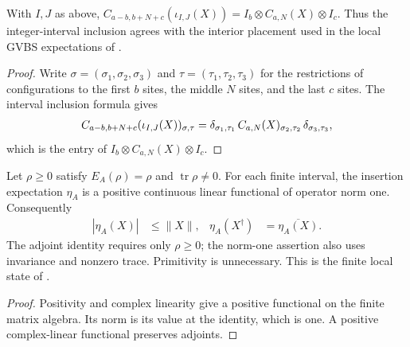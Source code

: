 \begin{lemma}
    \label{thm:local_interval_bulk_observable}
    \leanok
    With $I,J$ as above,
    $C_{a-b,b+N+c}(\iota_{I,J}(X))=I_b\otimes C_{a,N}(X)\otimes I_c$.
    Thus the integer-interval inclusion agrees with the interior placement
    used in the local GVBS expectations of
    \cite[Section~3, equations (3.1)--(3.2b)]{Nachtergaele1996Spectral}.
\end{lemma}
\begin{proof}\leanok
    Write $\sigma=(\sigma_1,\sigma_2,\sigma_3)$ and $\tau=(\tau_1,\tau_2,\tau_3)$
    for the restrictions of configurations to the first $b$ sites, the middle
    $N$ sites, and the last $c$ sites. The interval inclusion formula gives
    \begin{align}
        C_{a-b,b+N+c}(\iota_{I,J}(X))_{\sigma,\tau}
        =\delta_{\sigma_1,\tau_1}\,C_{a,N}(X)_{\sigma_2,\tau_2}\,
        \delta_{\sigma_3,\tau_3},
        \notag
    \end{align}
    which is the entry of $I_b\otimes C_{a,N}(X)\otimes I_c$.
\end{proof}

\begin{lemma}
    \label{thm:primitive_insertion_state_norm}
    \leanok
    Let $\rho\geq0$ satisfy $E_A(\rho)=\rho$ and
    $\operatorname{tr}\rho\neq0$. For each finite interval, the insertion
    expectation $\eta_A$ is a positive continuous linear functional of
    operator norm one. Consequently
    \begin{align}
        |\eta_A(X)| & \leq\|X\|,
                    & \eta_A(X^\dagger) & =\overline{\eta_A(X)}.
    \end{align}
    The adjoint identity requires only $\rho\geq0$; the norm-one assertion
    also uses invariance and nonzero trace. Primitivity is unnecessary.
    This is the finite local state of
    \cite[Section~3, equations (3.1)--(3.2b)]{Nachtergaele1996Spectral}.
\end{lemma}
\begin{proof}\leanok
    Positivity and complex linearity give a positive functional on the
    finite matrix algebra. Its norm is its value at the identity, which is
    one. A positive complex-linear functional preserves adjoints.
\end{proof}

